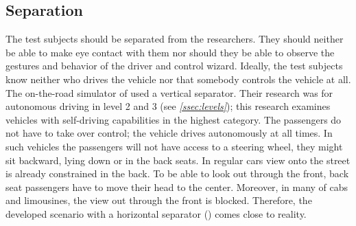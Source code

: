 \subsection{Separation}
The test subjects should be separated from the researchers. They should neither be able to make eye contact with them nor should they be able to observe the gestures and behavior of the driver and control wizard. Ideally, the test subjects know neither who drives the vehicle nor that somebody controls the vehicle at all. The on-the-road simulator of \citet{Baltodano2015} used a vertical separator. Their research was for autonomous driving in level 2 and 3 (see \emph{\ref{ssec:levels}}); this research examines vehicles with self-driving capabilities in the highest category. The passengers do not have to take over control; the vehicle drives autonomously at all times. In such vehicles the passengers will not have access to a steering wheel, they might sit backward, lying down or in the back seats. In regular cars view onto the street is already constrained in the back. To be able to look out through the front, back seat passengers have to move their head to the center. Moreover, in many of cabs and limousines, the view out through the front is blocked. Therefore, the developed scenario with a horizontal separator (\emph{}) comes close to reality. 

